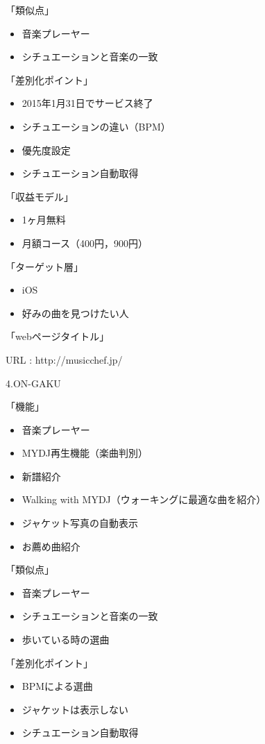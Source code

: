 「類似点」
\begin{itemize}
\item 音楽プレーヤー
\item シチュエーションと音楽の一致
\end{itemize}

「差別化ポイント」
\begin{itemize}
\item 2015年1月31日でサービス終了
\item シチュエーションの違い（BPM）
\item 優先度設定
\item シチュエーション自動取得
\end{itemize}

「収益モデル」
\begin{itemize}
\item 1ヶ月無料
\item 月額コース（400円，900円）
\end{itemize}

「ターゲット層」
\begin{itemize}
\item iOS
\item 好みの曲を見つけたい人
\end{itemize}

「webページタイトル」
\par
URL : http://musicchef.jp/
\\
\par
4.ON-GAKU
\par
「機能」
\begin{itemize}
\item 音楽プレーヤー
\item MYDJ再生機能（楽曲判別）
\item 新譜紹介
\item Walking with MYDJ（ウォーキングに最適な曲を紹介）
\item ジャケット写真の自動表示
\item お薦め曲紹介
\end{itemize}

「類似点」
\begin{itemize}
\item 音楽プレーヤー
\item シチュエーションと音楽の一致
\item 歩いている時の選曲
\end{itemize}

「差別化ポイント」
\begin{itemize}
\item BPMによる選曲
\item ジャケットは表示しない
\item シチュエーション自動取得
\end{itemize}

